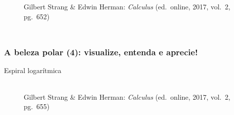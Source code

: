 \documentclass[pdftex, brazil, aspectratio=169]{beamer}
\begin{document}
\begin{frame}[t]
\begin{columns}
\begin{figure}[H]
\begin{center}
        \footnotesize{Gilbert Strang \& Edwin Herman: \emph{Calculus}
          (ed.\ online, 2017, vol.\ 2, pg.\ 652)}
      \end{center}
    \end{figure}
  \end{columns}
\end{frame}

\begin{frame}[t]
  \frametitle{A beleza polar (4): visualize, entenda e aprecie!}
  \centering
  Espiral logarítmica
    \begin{figure}[H]
      \begin{center}
        \label{fig:int2-24}
        \\
        \footnotesize{Gilbert Strang \& Edwin Herman: \emph{Calculus}
          (ed.\ online, 2017, vol.\ 2, pg.\ 655)}
      \end{center}
    \end{figure}
\end{frame}
\end{document}
